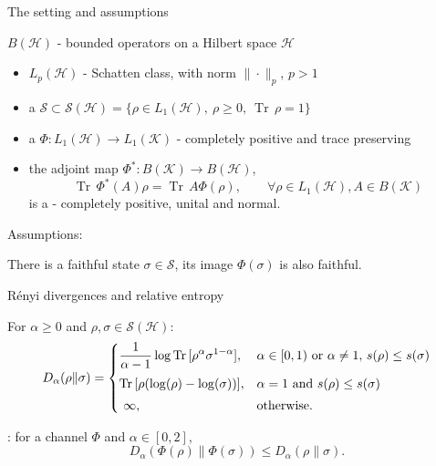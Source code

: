\documentclass[mathserif]{beamer}
\newcommand{\<}{\langle}
\renewcommand{\>}{\rangle}
\newcommand{\Tr}{\operatorname{Tr}\,}
\newcommand{\Se}{\mathcal S}
\newcommand{\Ha}{\mathcal H}
\newcommand{\Ka}{\mathcal K}
\begin{document}
\begin{frame}{The setting and assumptions}


$B(\mathcal H)$ - bounded operators on a Hilbert space $\Ha$
\medskip

\begin{itemize}
\item $L_p(\Ha)$ - Schatten class, with norm $\|\cdot\|_p$, $p>1$
\item a 
$\Se\subset \Se(\Ha)=\{\rho\in L_1(\Ha),\ \rho\ge 0,\ \Tr \rho=1\}$
\item a   $\Phi: L_1(\Ha)\to L_1(\Ka)$ - completely positive  and
trace preserving
\item the adjoint map  $\Phi^*: B(\Ka)\to B(\Ha)$,
\[
\Tr \Phi^*(A)\rho=\Tr A\Phi(\rho),\qquad \forall \rho\in L_1(\Ha), A\in B(\Ka)
\]
is a
 -  completely positive,
unital and normal.
\end{itemize}

\bigskip
Assumptions:
\medskip

There is  a faithful  state $\sigma\in \Se$, its image $\Phi(\sigma)$
is also  faithful.


\end{frame}







\begin{frame}{R\'enyi divergences and relative entropy}



For $\alpha\ge 0$ and $\rho,\sigma \in \Se(\Ha)$:
\[
D_\alpha(\rho\|\sigma)=\begin{dcases}
\frac{1}{\alpha-1}\log\Tr[\rho^\alpha\sigma^{1-\alpha}], & \alpha\in [0,1) \text{ or } \alpha\ne 1,\, 
s(\rho)\le s(\sigma)\\[0.2em]
\Tr[\rho(\log(\rho)-\log(\sigma))], &  \alpha=1 \text{ and } s(\rho)\le s(\sigma)\\[0.2em]
\ \infty, & \text{otherwise}.
\end{dcases}
\]

\bigskip

: for a channel $\Phi$ and $\alpha\in [0,2]$,
\[
D_\alpha(\Phi(\rho)\|\Phi(\sigma))\le D_\alpha(\rho\|\sigma).
\]



\end{frame}
\end{document}
